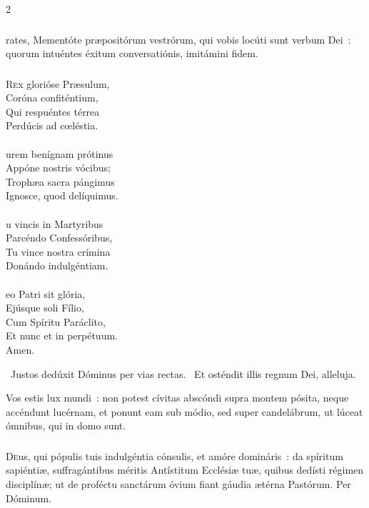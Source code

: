 \documentclass[9pt,twoside]{extarticle}
\begin{document}
\begin{multicols}{2}
\subsubsection*{}
rates, Mementóte præpositórum vestrórum, qui vobis locúti sunt verbum Dei~: quorum intuéntes éxitum conversatiónis, imitámini fidem.

\subsubsection*{\center {}}
\lettrine{R}ex glorióse Præsulum,\\
Coróna confiténtium,\\
Qui respuéntes térrea\\
Perdúcis ad cœléstia.\\
\\
urem benígnam prótinus\\
Appóne nostris vócibus;\\
Trophæa sacra pángimus\\
Ignosce, quod delíquimus.\\
\\
u vincis in Martyribus\\
Parcéndo Confessóribus,\\
Tu vince nostra crímina\\
Donándo indulgéntiam.\\
\\
eo Patri sit glória,\\
Ejúsque soli Fílio,\\
Cum Spíritu Paráclito,\\
Et nunc et in perpétuum.\\
Amen.

\begin{tightlist}{}
\item {}~Justos dedúxit Dóminus per vias rectas. ~Et osténdit illis regnum Dei, alleluja.
\item {} Vos estis lux mundi~: non potest cívitas abscóndi supra montem pósita, neque accéndunt lucérnam, et ponunt eam sub módio, sed super candelábrum, ut lúceat ómnibus, qui in domo sunt.
\end{tightlist}

\subsubsection*{\center {}}
\lettrine{D}eus, qui pópulis tuis indulgéntia cónsulis, et amóre domináris~: da spíritum sapiéntiæ, suffragántibus méritis Antístitum Ecclésiæ tuæ, quibus dedísti régimen disciplínæ; ut de proféctu sanctárum óvium fiant gáudia ætérna Pastórum. Per Dóminum.


\end{multicols}
\end{document}
